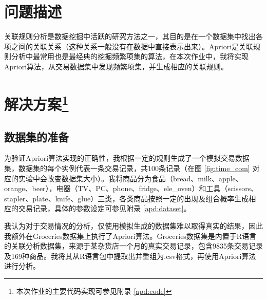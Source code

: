 \documentclass[12pt,a4paper]{article}
\theoremstyle{definition}
\begin{document}
\noindent
\noindent{}

\section{问题描述}

关联规则分析是数据挖掘中活跃的研究方法之一，其目的是在一个数据集中找出各项之间的关联关系（这种关系一般没有在数据中直接表示出来）。Apriori是关联规则分析中最常用也是最经典的挖掘频繁项集的算法，在本次作业中，我将实现Apriori算法，从交易数据集中发现频繁项集，并生成相应的关联规则。

\vspace{0.01\linewidth}
\section{解决方案\protect\footnote{本次作业的主要代码实现可参见附录 \ref{apd:code}}}

\vspace{0.006\linewidth}
\subsection{数据集的准备}

\vspace{0.006\linewidth}
为验证Apriori算法实现的正确性，我根据一定的规则生成了一个模拟交易数据集，数据集的每个实例代表一条交易记录，共100条记录（在图 \ref{fig:time_com} 对应的实验中会改变数据集大小）。我将商品分为食品（bread、milk、apple、orange、beer），电器（TV、PC、phone、fridge、ele\_oven）和工具（scissors、stapler、plate、knife、glue）三类，各类商品按照一定的出现及组合概率生成相应的交易记录，具体的参数设定可参见附录 \ref{apd:dataset}。

\vspace{0.015\linewidth}
我认为对于交易情况的分析，仅使用模拟生成的数据集难以取得真实的结果，因此我额外在Groceries数据集上执行了Apriori算法。Groceries数据集是内置于R语言的关联分析数据集，来源于某杂货店一个月的真实交易记录，包含9835条交易记录及169种商品。我将其从R语言包中提取出并重组为.csv格式，再使用Apriori算法进行分析。

\vspace{0.006\linewidth}
\end{document}
